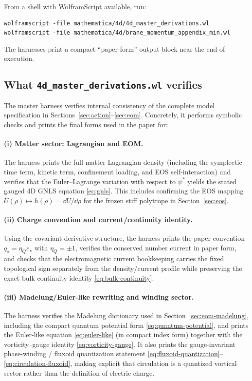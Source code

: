 \documentclass[11pt]{article}
\newcommand{\etaQ}{\eta_Q}
\newcommand{\estar}{e_\star}
\newcommand{\qstar}{q_\star}
\begin{document}
From a shell with WolframScript available, run:
\begin{verbatim}
wolframscript -file mathematica/4d/4d_master_derivations.wl
wolframscript -file mathematica/4d/brane_momentum_appendix_min.wl
\end{verbatim}
The harnesses print a compact ``paper-form'' output block near the end of execution.

\subsection{What \texttt{4d\_master\_derivations.wl} verifies}
\label{app:wl-master}

The master harness verifies internal consistency of the complete model specification in Sections~\ref{sec:action}--\ref{sec:eom}. Concretely, it performs symbolic checks and prints the final forms used in the paper for:

\paragraph{(i) Matter sector: Lagrangian and EOM.}
The harness prints the full matter Lagrangian density (including the symplectic time term, kinetic term, confinement loading, and EOS self-interaction) and verifies that the Euler--Lagrange variation with respect to $\psi^*$ yields the stated gauged 4D GNLS equation \eqref{eq:gnls}. This includes confirming the EOS mapping $U(\rho)\mapsto h(\rho)=\dd U/\dd\rho$ for the frozen stiff polytrope in Section~\ref{sec:eos}.

\paragraph{(ii) Charge convention and current/continuity identity.}
Using the covariant-derivative structure, the harness prints the paper convention $\qstar=\etaQ\estar$ with $\etaQ=\pm1$, verifies the conserved number current in paper form, and checks that the electromagnetic current bookkeeping carries the fixed topological sign separately from the density/current profile while preserving the exact bulk continuity identity \eqref{eq:bulk-continuity}.

\paragraph{(iii) Madelung/Euler-like rewriting and winding sector.}
The harness verifies the Madelung dictionary used in Section~\ref{sec:eom-madelung}, including the compact quantum potential form \eqref{eq:quantum-potential}, and prints the Euler-like equation \eqref{eq:euler-like} (in compact index form) together with the vorticity--gauge identity \eqref{eq:vorticity-gauge}. It also prints the gauge-invariant phase-winding / fluxoid quantization statement \eqref{eq:fluxoid-quantization}--\eqref{eq:circulation-fluxoid}, making explicit that circulation is a quantized vortical sector rather than the definition of electric charge.
\end{document}
